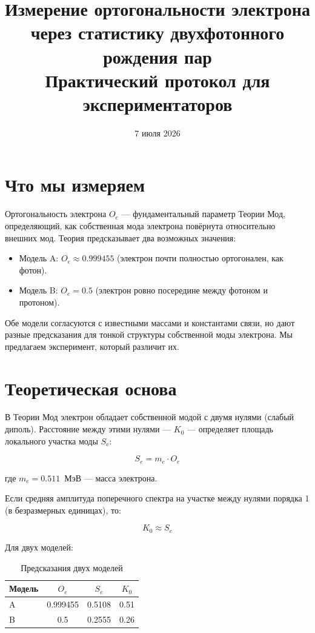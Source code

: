 \documentclass[12pt,a4paper]{article}
\title{\textbf{Измерение ортогональности электрона через статистику двухфотонного рождения пар}\\
\large Практический протокол для экспериментаторов}
\author{}
\date{7 июля 2026}
\begin{document}
\maketitle

\section{Что мы измеряем}
Ортогональность электрона $O_e$ — фундаментальный параметр Теории Мод, определяющий, как собственная мода электрона повёрнута относительно внешних мод. Теория предсказывает два возможных значения:

\begin{itemize}
    \item Модель A: $O_e \approx 0.999455$ (электрон почти полностью ортогонален, как фотон).
    \item Модель B: $O_e = 0.5$ (электрон ровно посередине между фотоном и протоном).
\end{itemize}

Обе модели согласуются с известными массами и константами связи, но дают разные предсказания для тонкой структуры собственной моды электрона. Мы предлагаем эксперимент, который различит их.

\section{Теоретическая основа}
В Теории Мод электрон обладает собственной модой с двумя нулями (слабый диполь). Расстояние между этими нулями — $K_0$ — определяет площадь локального участка моды $S_e$:

\begin{equation}
    S_e = m_e \cdot O_e
\end{equation}

где $m_e = 0.511$~МэВ — масса электрона.

Если средняя амплитуда поперечного спектра на участке между нулями порядка 1 (в безразмерных единицах), то:

\begin{equation}
    K_0 \approx S_e
\end{equation}

Для двух моделей:

\begin{table}[h]
    \centering
    \caption{Предсказания двух моделей}
    \begin{tabular}{lccc}
        \toprule
        Модель & $O_e$ & $S_e$ & $K_0$ \\
        \midrule
        A & 0.999455 & 0.5108 & 0.51 \\
        B & 0.5 & 0.2555 & 0.26 \\
        \bottomrule
    \end{tabular}
    \label{tab:models}
\end{table}
\end{document}
